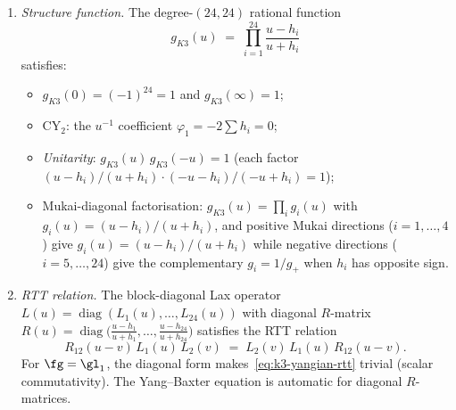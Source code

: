 \begin{theorem}
\begin{enumerate}[label=\textup{(\roman*)}]
\item \emph{Structure function.}
The degree-$(24,24)$ rational function
\begin{equation}\label{eq:k3-yangian-structure-fn}
 g_{K3}(u) \;=\; \prod_{i=1}^{24}
 \frac{u - h_i}{u + h_i}
\end{equation}
satisfies:
\begin{itemize}
 \item $g_{K3}(0) = (-1)^{24} = 1$ and $g_{K3}(\infty) = 1$;
 \item CY$_2$: the $u^{-1}$ coefficient $\varphi_1 = -2\sum h_i = 0$;
 \item \emph{Unitarity}: $g_{K3}(u)\, g_{K3}(-u) = 1$
 (each factor $(u-h_i)/(u+h_i) \cdot (-u-h_i)/(-u+h_i) = 1$);
 \item Mukai-diagonal factorisation: $g_{K3}(u) = \prod_i g_i(u)$
 with $g_i(u) = (u - h_i)/(u + h_i)$, and positive Mukai directions
 ($i = 1,\ldots,4$) give $g_i(u) = (u-h_i)/(u+h_i)$ while negative
 directions ($i = 5,\ldots,24$) give the complementary
 $g_i = 1/g_+$ when $h_i$ has opposite sign.
\end{itemize}

\item \emph{RTT relation.}
The block-diagonal Lax operator
$L(u) = \operatorname{diag}(L_1(u), \ldots, L_{24}(u))$
with diagonal $R$-matrix
$R(u) = \operatorname{diag}\bigl(\tfrac{u-h_1}{u+h_1},\ldots,
\tfrac{u-h_{24}}{u+h_{24}}\bigr)$
satisfies the RTT relation
\begin{equation}\label{eq:k3-yangian-rtt}
 R_{12}(u-v)\, L_1(u)\, L_2(v) \;=\;
 L_2(v)\, L_1(u)\, R_{12}(u-v).
\end{equation}
For $\fg = \gl_1$, the diagonal form makes~\eqref{eq:k3-yangian-rtt}
trivial (scalar commutativity).
The Yang--Baxter equation is automatic for diagonal $R$-matrices.


\end{enumerate}
\end{theorem}
